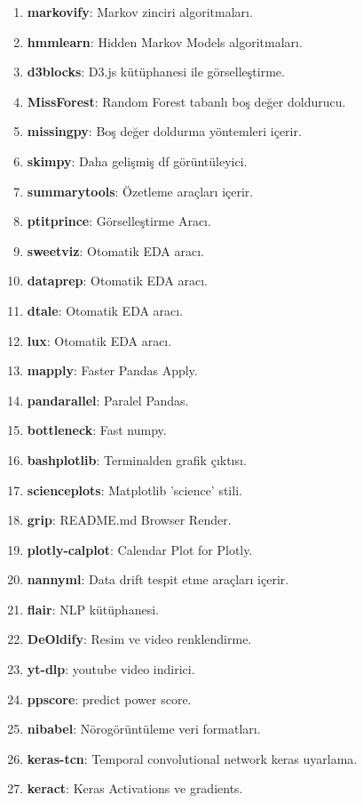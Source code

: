 \begin{enumerate}
    \item \textbf{markovify}: Markov zinciri algoritmaları.
    \item \textbf{hmmlearn}: Hidden Markov Models algoritmaları.
    \item \textbf{d3blocks}: D3.js kütüphanesi ile görselleştirme.
    \item \textbf{MissForest}: Random Forest tabanlı boş değer doldurucu.
    \item \textbf{missingpy}: Boş değer doldurma yöntemleri içerir.
    \item \textbf{skimpy}: Daha gelişmiş df görüntüleyici.
    \item \textbf{summarytools}: Özetleme araçları içerir.
    \item \textbf{ptitprince}: Görselleştirme Aracı.
    \item \textbf{sweetviz}: Otomatik EDA aracı.
    \item \textbf{dataprep}: Otomatik EDA aracı.
    \item \textbf{dtale}: Otomatik EDA aracı.
    \item \textbf{lux}: Otomatik EDA aracı.
    \item \textbf{mapply}: Faster Pandas Apply.
    \item \textbf{pandarallel}: Paralel Pandas.
    \item \textbf{bottleneck}: Fast numpy.
    \item \textbf{bashplotlib}: Terminalden grafik çıktısı.
    \item \textbf{scienceplots}: Matplotlib 'science' stili.
    \item \textbf{grip}: README.md Browser Render.
    \item \textbf{plotly-calplot}: Calendar Plot for Plotly.
    \item \textbf{nannyml}: Data drift tespit etme araçları içerir.
    \item \textbf{flair}: NLP kütüphanesi.
    \item \textbf{DeOldify}: Resim ve video renklendirme.
    \item \textbf{yt-dlp}: youtube video indirici.
    \item \textbf{ppscore}: predict power score.
    \item \textbf{nibabel}: Nörogörüntüleme veri formatları.
    \item \textbf{keras-tcn}: Temporal convolutional network keras uyarlama.
    \item \textbf{keract}: Keras Activations ve gradients.

\end{enumerate}

